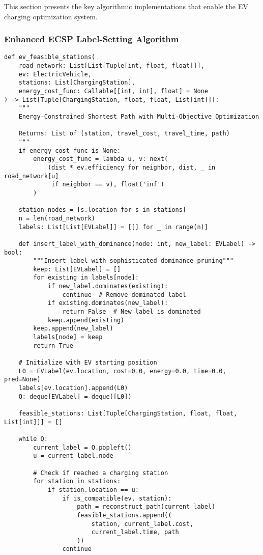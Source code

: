 \documentclass[12pt,a4paper]{article}
\begin{document}
This section presents the key algorithmic implementations that enable the EV charging optimization system.

\subsubsection{Enhanced ECSP Label-Setting Algorithm}

\begin{lstlisting}[caption=Complete ECSP Implementation,label=lst:ecsp]
def ev_feasible_stations(
    road_network: List[List[Tuple[int, float, float]]],
    ev: ElectricVehicle,
    stations: List[ChargingStation],
    energy_cost_func: Callable[[int, int], float] = None
) -> List[Tuple[ChargingStation, float, float, List[int]]]:
    """
    Energy-Constrained Shortest Path with Multi-Objective Optimization
    
    Returns: List of (station, travel_cost, travel_time, path)
    """
    if energy_cost_func is None:
        energy_cost_func = lambda u, v: next(
            (dist * ev.efficiency for neighbor, dist, _ in road_network[u] 
             if neighbor == v), float('inf')
        )
    
    station_nodes = [s.location for s in stations]
    n = len(road_network)
    labels: List[List[EVLabel]] = [[] for _ in range(n)]
    
    def insert_label_with_dominance(node: int, new_label: EVLabel) -> bool:
        """Insert label with sophisticated dominance pruning"""
        keep: List[EVLabel] = []
        for existing in labels[node]:
            if new_label.dominates(existing):
                continue  # Remove dominated label
            if existing.dominates(new_label):
                return False  # New label is dominated
            keep.append(existing)
        keep.append(new_label)
        labels[node] = keep
        return True

    # Initialize with EV starting position
    L0 = EVLabel(ev.location, cost=0.0, energy=0.0, time=0.0, pred=None)
    labels[ev.location].append(L0)
    Q: deque[EVLabel] = deque([L0])
    
    feasible_stations: List[Tuple[ChargingStation, float, float, List[int]]] = []
    
    while Q:
        current_label = Q.popleft()
        u = current_label.node
        
        # Check if reached a charging station
        for station in stations:
            if station.location == u:
                if is_compatible(ev, station):
                    path = reconstruct_path(current_label)
                    feasible_stations.append((
                        station, current_label.cost, 
                        current_label.time, path
                    ))
                continue
        

\end{lstlisting}
\end{document}
